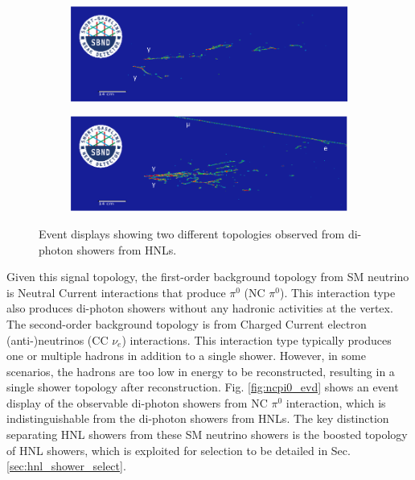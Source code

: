 \begin{figure}[htbp!]
	\centering
        \begin{subfigure}[b]{0.85\textwidth}  
            \centering 
            \includegraphics[width=\textwidth]{hnl_2shw}
            \caption{}%
	    \label{fig:hnl_evd_1shw}
        \end{subfigure}
        \centering
        \begin{subfigure}[b]{0.85\textwidth}   
            \centering 
            \includegraphics[width=\textwidth]{hnl_1shw}
            \caption{}%
	    \label{fig:hnl_evd_2shw}
	\end{subfigure}
        \caption{
		Event displays showing two different topologies observed from di-photon showers from HNLs. 
	}
        \label{fig:hnl_evd_select}
\end{figure}

Given this signal topology, the first-order background topology from SM neutrino is Neutral Current interactions that produce $\pi^0$ (NC $\pi^0$).
This interaction type also produces di-photon showers without any hadronic activities at the vertex.
The second-order background topology is from Charged Current electron (anti-)neutrinos (CC $\nu_e$) interactions.
This interaction type typically produces one or multiple hadrons in addition to a single shower.
However, in some scenarios, the hadrons are too low in energy to be reconstructed, resulting in a single shower topology after reconstruction.
Fig. \ref{fig:ncpi0_evd} shows an event display of the observable di-photon showers from NC $\pi^0$ interaction, which is indistinguishable from the di-photon showers from HNLs.
The key distinction separating HNL showers from these SM neutrino showers is the boosted topology of HNL showers, which is exploited for selection to be detailed in Sec. \ref{sec:hnl_shower_select}.

